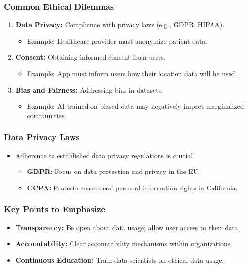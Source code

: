 \documentclass[aspectratio=169]{beamer}
\begin{document}
\begin{frame}[fragile]
    \frametitle{Common Ethical Dilemmas}
    \begin{enumerate}
        \item \textbf{Data Privacy:} Compliance with privacy laws (e.g., GDPR, HIPAA).
        \begin{itemize}
            \item Example: Healthcare provider must anonymize patient data.
        \end{itemize}
        
        \item \textbf{Consent:} Obtaining informed consent from users.
        \begin{itemize}
            \item Example: App must inform users how their location data will be used.
        \end{itemize}
        
        \item \textbf{Bias and Fairness:} Addressing bias in datasets.
        \begin{itemize}
            \item Example: AI trained on biased data may negatively impact marginalized communities.
        \end{itemize}
    \end{enumerate}
\end{frame}

\begin{frame}[fragile]
    \frametitle{Data Privacy Laws}
    \begin{itemize}
        \item Adherence to established data privacy regulations is crucial.
        \begin{itemize}
            \item \textbf{GDPR:} Focus on data protection and privacy in the EU.
            \item \textbf{CCPA:} Protects consumers' personal information rights in California.
        \end{itemize}
    \end{itemize}
\end{frame}

\begin{frame}[fragile]
    \frametitle{Key Points to Emphasize}
    \begin{itemize}
        \item \textbf{Transparency:} Be open about data usage; allow user access to their data.
        \item \textbf{Accountability:} Clear accountability mechanisms within organizations.
        \item \textbf{Continuous Education:} Train data scientists on ethical data usage.
    \end{itemize}
\end{frame}
\end{document}
